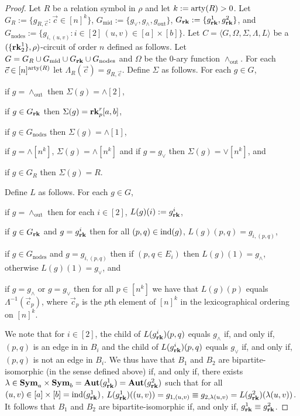 \documentclass[../paper.tex]{subfiles}
\begin{document}
\begin{proof}
  Let $R$ be a relation symbol in $\rho$ and let $k := \mathrm{arty}(R) > 0$. Let $G_{R}
  := \{g_{R, \vec{c}} : \vec{c} \in [n]^k\}$, $G_{\text{mid}} := \{g_{\lor},
  g_{\land}, g_{\text{out}} \}$, $G_{\text{\textbf{rk}}} : = \{ g^1_{\text{\textbf{rk}}}, g^2_{\text{\textbf{rk}}}\}$,
  and $G_{\text{nodes}} := \{g_{i, (u,v)} : i \in [2] \, (u,v) \in [a] \times
  [b] \}$. Let $C = \langle G, \Omega, \Sigma, \Lambda, L \rangle$ be a
  $(\{\text{\textbf{rk}}^{1}_2\}, \rho)$-circuit of order $n$ defined as follows. Let $G =
  G_R \cup G_{\text{mid}} \cup G_{\text{\textbf{rk}}} \cup G_{\text{nodes}}$ and $\Omega$ be
  the $0$-ary function $\land_{\text{out}}$. For each $\vec{c} \in
  [n]^{\mathrm{arty}(R)}$ let $\Lambda_R(\vec{c}) = g_{R, \vec{c}}$. Define $\Sigma$ as
  follows. For each $g \in G$,
  \begin{itemizens}
    \setlength\itemsep{0mm}
  \item if $g = \land_{\text{out}}$ then $\Sigma(g) = \land[2]$,
  \item if $g \in G_{\text{\textbf{rk}}}$ then $\Sigma(g) = \text{\textbf{rk}}^r_p [a,b]$,
  \item if $g \in G_{\text{nodes}}$ then $\Sigma(g) = \land[1]$,
  \item if $g = \land[n^k]$, $\Sigma (g) = \land[n^k]$ and if $g = g_{\lor}$
    then $\Sigma(g) = \lor[n^k]$, and
  \item if $g \in G_R$ then $\Sigma(g) = R$.
  \end{itemizens}
  Define $L$ as follows. For each $g \in G$,
  \begin{itemizens}
    \setlength\itemsep{0mm}
  \item if $g = \land_{\text{out}}$ then for each $i \in [2]$, $L(g)(i) :=
    g^i_{\text{\textbf{rk}}}$,
  \item if $g \in G_{\text{\textbf{rk}}}$ and $g = g^i_{\text{\textbf{rk}}}$ then for all $(p,q) \in
    \text{\upshape ind}(g)$, $L(g)(p,q) = g_{i, (p,q)}$,
  \item if $g \in G_{\text{nodes}}$ and $g = g_{i, (p,q)}$ then if $(p, q \in
    E_i)$ then $L(g)(1) = g_{\land}$, otherwise $L(g)(1) = g_\lor$, and
  \item if $g = g_\land$ or $g = g_\lor$ then for all $p \in [n^k]$ we have that
    $L(g)(p)$ equals $\Lambda^{-1}(\vec{c}_p)$, where $\vec{c}_p$ is the $p$th
    element of $[n]^k$ in the lexicographical ordering on $[n]^k$.
  \end{itemizens}

  We note that for $i \in [2]$, the child of $L(g^i_{\text{\textbf{rk}}})(p,q)$ equals
  $g_\land$ if, and only if, $(p,q)$ is an edge in in $B_i$ and the child of
  $L(g^i_{\text{\textbf{rk}}})(p,q) $ equals $g_\lor$ if, and only if, $(p,q)$ is not an edge
  in $B_i$. We thus have that $B_1$ and $B_2$ are bipartite-isomorphic (in the
  sense defined above) if, and only if, there exists $\lambda \in \text{\textbf{Sym}}_{a}
  \times \text{\textbf{Sym}}_{b} = \text{\textbf{Aut}}(g^1_{\text{\textbf{rk}}}) = \text{\textbf{Aut}}(g^2_{\text{\textbf{rk}}})$ such that for all
  $(u,v) \in [a] \times [b] = \text{\upshape ind}(g^1_{\text{\textbf{rk}}})$, $L(g^1_{\text{\textbf{rk}}})((u,v)) = g_{1,
    (u,v)} \equiv g_{2, \lambda (u,v)} = L(g^2_{\text{\textbf{rk}}})(\lambda (u,v))$. It
  follows that $B_1$ and $B_2$ are bipartite-isomorphic if, and only if,
  $g^1_{\text{\textbf{rk}}} \equiv g^2_{\text{\textbf{rk}}}$.


\end{proof}
\end{document}

